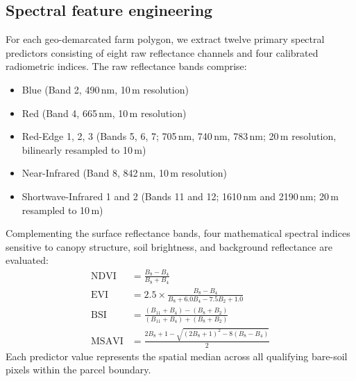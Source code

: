 \documentclass[a4paper,10pt]{article}
\begin{document}
\subsection{Spectral feature engineering}
For each geo-demarcated farm polygon, we extract twelve primary spectral predictors consisting of eight raw reflectance channels and four calibrated radiometric indices. The raw reflectance bands comprise:
\begin{itemize}[noitemsep,topsep=2pt]
  \item Blue (Band 2, 490\,nm, 10\,m resolution)
  \item Red (Band 4, 665\,nm, 10\,m resolution)
  \item Red-Edge 1, 2, 3 (Bands 5, 6, 7; 705\,nm, 740\,nm, 783\,nm; 20\,m resolution, bilinearly resampled to 10\,m)
  \item Near-Infrared (Band 8, 842\,nm, 10\,m resolution)
  \item Shortwave-Infrared 1 and 2 (Bands 11 and 12; 1610\,nm and 2190\,nm; 20\,m resampled to 10\,m)
\end{itemize}

Complementing the surface reflectance bands, four mathematical spectral indices sensitive to canopy structure, soil brightness, and background reflectance are evaluated:
\begin{align}
  \text{NDVI} &= \frac{B_8 - B_4}{B_8 + B_4} \\
  \text{EVI} &= 2.5 \times \frac{B_8 - B_4}{B_8 + 6.0 B_4 - 7.5 B_2 + 1.0} \\
  \text{BSI} &= \frac{(B_{11} + B_4) - (B_8 + B_2)}{(B_{11} + B_4) + (B_8 + B_2)} \\
  \text{MSAVI} &= \frac{2 B_8 + 1 - \sqrt{(2 B_8 + 1)^2 - 8 (B_8 - B_4)}}{2}
\end{align}
Each predictor value represents the spatial median across all qualifying bare-soil pixels within the parcel boundary.
\end{document}
